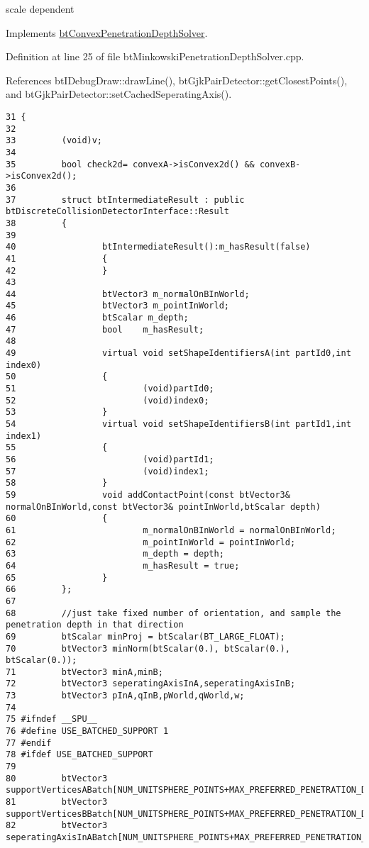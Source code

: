 scale dependent 

Implements \hyperlink{classbt_convex_penetration_depth_solver}{btConvexPenetrationDepthSolver}.

Definition at line 25 of file btMinkowskiPenetrationDepthSolver.cpp.

References btIDebugDraw::drawLine(), btGjkPairDetector::getClosestPoints(), and btGjkPairDetector::setCachedSeperatingAxis().

\begin{Code}\begin{verbatim}31 {
32 
33         (void)v;
34         
35         bool check2d= convexA->isConvex2d() && convexB->isConvex2d();
36 
37         struct btIntermediateResult : public btDiscreteCollisionDetectorInterface::Result
38         {
39 
40                 btIntermediateResult():m_hasResult(false)
41                 {
42                 }
43                 
44                 btVector3 m_normalOnBInWorld;
45                 btVector3 m_pointInWorld;
46                 btScalar m_depth;
47                 bool    m_hasResult;
48 
49                 virtual void setShapeIdentifiersA(int partId0,int index0)
50                 {
51                         (void)partId0;
52                         (void)index0;
53                 }
54                 virtual void setShapeIdentifiersB(int partId1,int index1)
55                 {
56                         (void)partId1;
57                         (void)index1;
58                 }
59                 void addContactPoint(const btVector3& normalOnBInWorld,const btVector3& pointInWorld,btScalar depth)
60                 {
61                         m_normalOnBInWorld = normalOnBInWorld;
62                         m_pointInWorld = pointInWorld;
63                         m_depth = depth;
64                         m_hasResult = true;
65                 }
66         };
67 
68         //just take fixed number of orientation, and sample the penetration depth in that direction
69         btScalar minProj = btScalar(BT_LARGE_FLOAT);
70         btVector3 minNorm(btScalar(0.), btScalar(0.), btScalar(0.));
71         btVector3 minA,minB;
72         btVector3 seperatingAxisInA,seperatingAxisInB;
73         btVector3 pInA,qInB,pWorld,qWorld,w;
74 
75 #ifndef __SPU__
76 #define USE_BATCHED_SUPPORT 1
77 #endif
78 #ifdef USE_BATCHED_SUPPORT
79 
80         btVector3       supportVerticesABatch[NUM_UNITSPHERE_POINTS+MAX_PREFERRED_PENETRATION_DIRECTIONS*2];
81         btVector3       supportVerticesBBatch[NUM_UNITSPHERE_POINTS+MAX_PREFERRED_PENETRATION_DIRECTIONS*2];
82         btVector3       seperatingAxisInABatch[NUM_UNITSPHERE_POINTS+MAX_PREFERRED_PENETRATION_DIRECTIONS*2];

\end{verbatim}
\end{Code}

